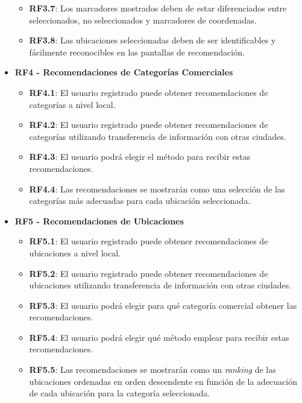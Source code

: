 \begin{itemize}
\begin{itemize}
			\item \textbf{RF3.7}: Los marcadores mostrados deben de estar diferenciados entre seleccionados, no seleccionados y marcadores de coordenadas.
			\item \textbf{RF3.8}: Las ubicaciones seleccionadas deben de ser identificables y fácilmente reconocibles en las pantallas de recomendación.
		\end{itemize}
	\item \textbf{RF4 - Recomendaciones de Categorías Comerciales}
	\begin{itemize}
		\item \textbf{RF4.1}: El usuario registrado puede obtener recomendaciones de categorías a nivel local.
		\item \textbf{RF4.2}: El usuario registrado puede obtener recomendaciones de categorías utilizando transferencia de información con otras ciudades.
		\item \textbf{RF4.3}: El usuario podrá elegir el método para recibir estas recomendaciones.
		\item \textbf{RF4.4}: Las recomendaciones se mostrarán como una selección de las categorías más adecuadas para cada ubicación seleccionada.
	\end{itemize}
	\item \textbf{RF5 - Recomendaciones de Ubicaciones}
	\begin{itemize}
		\item \textbf{RF5.1}: El usuario registrado puede obtener recomendaciones de ubicaciones a nivel local.
		\item \textbf{RF5.2}: El usuario registrado puede obtener recomendaciones de ubicaciones utilizando transferencia de información con otras ciudades.
		\item \textbf{RF5.3}: El usuario podrá elegir para qué categoría comercial obtener las recomendaciones.
		\item \textbf{RF5.4}: El usuario podrá elegir qué método emplear para recibir estas recomendaciones.
		\item  \textbf{RF5.5}: Las recomendaciones se mostrarán como un \textit{ranking} de las ubicaciones ordenadas en orden descendente en función de la adecuación de cada ubicación para la categoría seleccionada.
		
	\end{itemize}
	

\end{itemize}
